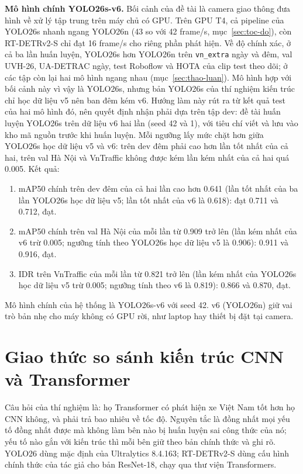 \textbf{Mô hình chính YOLO26s-v6.} Bối cảnh của đề tài là camera giao thông đưa hình về xử lý tập trung trên máy chủ có
GPU. Trên GPU T4, cả pipeline của YOLO26s nhanh ngang YOLO26n (43 so với 42 frame/s, mục~\ref{sec:toc-do}), còn
RT-DETRv2-S chỉ đạt 16 frame/s cho riêng phần phát hiện. Về độ chính xác, ở cả ba lần huấn luyện, YOLO26s hơn YOLO26n
trên \texttt{vn\_extra} ngày và đêm, val UVH-26, UA-DETRAC ngày, test Roboflow và HOTA của clip test theo dõi; ở các
tập còn lại hai mô hình ngang nhau (mục~\ref{sec:thao-luan}). Mô hình hợp với bối cảnh này vì vậy là YOLO26s, nhưng
bản YOLO26s của thí nghiệm kiến trúc chỉ học dữ liệu v5 nên ban đêm kém v6. Hướng làm này rút ra từ kết quả test của
hai mô hình đó, nên quyết định nhận phải dựa trên tập dev: đề tài huấn luyện YOLO26s trên dữ liệu v6 hai lần (seed 42
và 1), với tiêu chí viết và lưu vào kho mã nguồn trước khi huấn luyện. Mỗi ngưỡng lấy mức chặt hơn giữa YOLO26s học dữ
liệu v5 và v6: trên dev đêm phải cao hơn lần tốt nhất của cả hai, trên val Hà Nội và VnTraffic không được kém lần kém
nhất của cả hai quá 0.005. Kết quả:
\begin{enumerate}
  \item mAP50 chính trên dev đêm của cả hai lần cao hơn 0.641 (lần tốt nhất của ba lần YOLO26s học dữ liệu v5; lần tốt
        nhất của v6 là 0.618): đạt 0.711 và 0.712, đạt.
  \item mAP50 chính trên val Hà Nội của mỗi lần từ 0.909 trở lên (lần kém nhất của v6 trừ 0.005; ngưỡng tính theo
        YOLO26s học dữ liệu v5 là 0.906): 0.911 và 0.916, đạt.
  \item IDR trên VnTraffic của mỗi lần từ 0.821 trở lên (lần kém nhất của YOLO26s học dữ liệu v5 trừ 0.005; ngưỡng tính
        theo v6 là 0.819): 0.866 và 0.870, đạt.
\end{enumerate}
Mô hình chính của hệ thống là YOLO26s-v6 với seed 42. v6 (YOLO26n) giữ vai trò bản nhẹ cho máy không có GPU
rời, như laptop hay thiết bị đặt tại camera.

\section{Giao thức so sánh kiến trúc CNN và Transformer}
\label{sec:giao-thuc}

Câu hỏi của thí nghiệm là: họ Transformer có phát hiện xe Việt Nam tốt hơn họ CNN không, và phải trả bao nhiêu về tốc
độ. Nguyên tắc là đồng nhất mọi yếu tố đồng nhất được mà không làm bên nào bị huấn luyện sai công thức của nó; yếu tố
nào gắn với kiến trúc thì mỗi bên giữ theo bản chính thức và ghi rõ. YOLO26 dùng mặc định của Ultralytics 8.4.163;
RT-DETRv2-S dùng cấu hình chính thức của tác giả cho bản ResNet-18, chạy qua thư viện Transformers.

